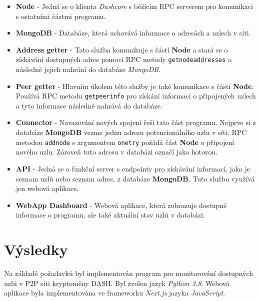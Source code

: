 \documentclass[12pt]{article}
\begin{document}
\begin{itemize}
    \item \textbf{Node} - Jedná se o klienta \textit{Dashcore} s běžícím RPC serverem pro komunikaci s ostatními částmi programu.
    \item \textbf{MongoDB} - Databáze, která uchovává informace o adresách a uzlech v síti.
    \item \textbf{Address getter} - Tato služba komunikuje s částí \textbf{Node} a stará se o získávání dostupných adres pomocí RPC metody \texttt{getnodeaddresses} a následně jejich nahrání do databáze \textit{MongoDB}.
    \item \textbf{Peer getter} - Hlavním úkolem této služby je také komunikace s částí \textbf{Node}. Používá RPC metodu \texttt{getpeerinfo} pro získání informací o připojených uzlech a tyto informace následně nahrává do databáze.
    \item \textbf{Connector} - Navazování nových spojení řeší tato část programu. Nejprve si z databáze \textbf{MongoDB} vezme jednu adresu potencionálního uzlu v síti. RPC metodou \texttt{addnode} s argumentem \texttt{onetry} požádá část \textbf{Node} o připojení nového uzlu. Zároveň tuto adresu v databázi označí jako hotovou.
    \item \textbf{API} - Jedná se o funkční server s endpointy pro získávání informací, jako je seznam uzlů nebo seznam adres, z databáze \textbf{MongoDB}. Tuto službu využívá jen webová aplikace.
    \item \textbf{WebApp Dashboard} - Webová aplikace, která zobrazuje dostupné informace o programu, ale také aktuální stav uzlů v databázi.
\end{itemize}

\section{Výsledky}
Na základě požadavků byl implementován program pro monitorování dostupných uzlů v P2P síti kryptoměny DASH. Byl zvolen jazyk \textit{Python 3.8}. Webová aplikace byla implementována ve frameworku \textit{Next.js} jazyka \textit{JavaScript}.
\end{document}
